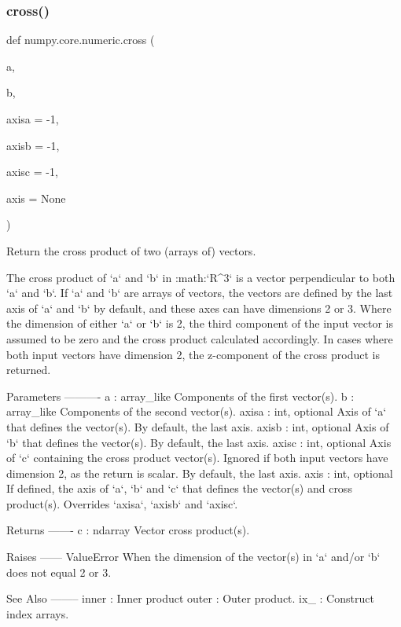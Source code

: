 \subsubsection{\texorpdfstring{cross()}{cross()}}
{\footnotesize\ttfamily def numpy.\+core.\+numeric.\+cross (\begin{DoxyParamCaption}\item[{}]{a,  }\item[{}]{b,  }\item[{}]{axisa = {\ttfamily -\/1},  }\item[{}]{axisb = {\ttfamily -\/1},  }\item[{}]{axisc = {\ttfamily -\/1},  }\item[{}]{axis = {\ttfamily None} }\end{DoxyParamCaption})}

\begin{DoxyVerb}Return the cross product of two (arrays of) vectors.

The cross product of `a` and `b` in :math:`R^3` is a vector perpendicular
to both `a` and `b`.  If `a` and `b` are arrays of vectors, the vectors
are defined by the last axis of `a` and `b` by default, and these axes
can have dimensions 2 or 3.  Where the dimension of either `a` or `b` is
2, the third component of the input vector is assumed to be zero and the
cross product calculated accordingly.  In cases where both input vectors
have dimension 2, the z-component of the cross product is returned.

Parameters
----------
a : array_like
    Components of the first vector(s).
b : array_like
    Components of the second vector(s).
axisa : int, optional
    Axis of `a` that defines the vector(s).  By default, the last axis.
axisb : int, optional
    Axis of `b` that defines the vector(s).  By default, the last axis.
axisc : int, optional
    Axis of `c` containing the cross product vector(s).  Ignored if
    both input vectors have dimension 2, as the return is scalar.
    By default, the last axis.
axis : int, optional
    If defined, the axis of `a`, `b` and `c` that defines the vector(s)
    and cross product(s).  Overrides `axisa`, `axisb` and `axisc`.

Returns
-------
c : ndarray
    Vector cross product(s).

Raises
------
ValueError
    When the dimension of the vector(s) in `a` and/or `b` does not
    equal 2 or 3.

See Also
--------
inner : Inner product
outer : Outer product.
ix_ : Construct index arrays.


\end{DoxyVerb}
